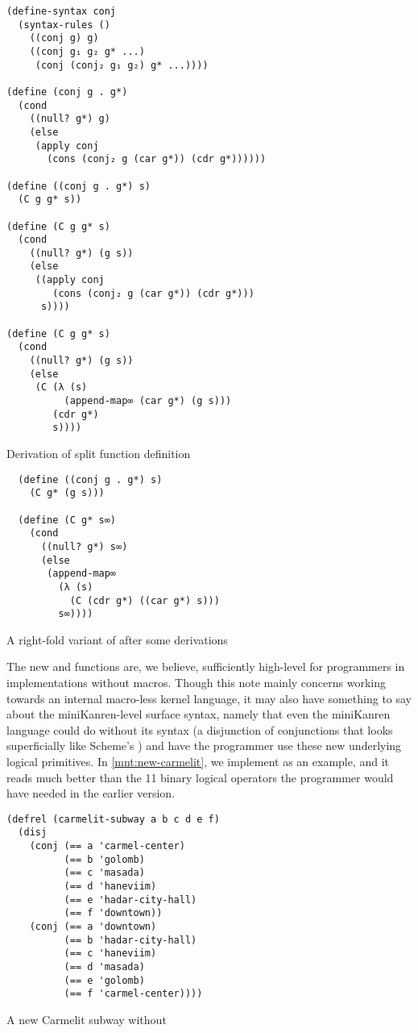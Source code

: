 \documentclass[sigplan,balance=true,pbalance=true,natbib=false]{acmart}
\begin{document}
\begin{listing}[h]
\begin{verbatim}
(define-syntax conj
  (syntax-rules ()
    ((conj g) g)
    ((conj g₁ g₂ g* ...)
     (conj (conj₂ g₁ g₂) g* ...))))

(define (conj g . g*)
  (cond
    ((null? g*) g)
    (else
     (apply conj
       (cons (conj₂ g (car g*)) (cdr g*))))))

(define ((conj g . g*) s)
  (C g g* s))

(define (C g g* s)
  (cond
    ((null? g*) (g s))
    (else
     ((apply conj
        (cons (conj₂ g (car g*)) (cdr g*)))
      s))))

(define (C g g* s)
  (cond
    ((null? g*) (g s))
    (else
     (C (λ (s)
          (append-map∞ (car g*) (g s)))
        (cdr g*)
        s))))
\end{verbatim}
  \caption{Derivation of split  function definition}\label{mnt:conj-substituted-through}
\end{listing}

\begin{listing}[h]
\begin{verbatim}
  (define ((conj g . g*) s)
    (C g* (g s)))

  (define (C g* s∞)
    (cond
      ((null? g*) s∞)
      (else
       (append-map∞
         (λ (s)
           (C (cdr g*) ((car g*) s)))
         s∞))))
\end{verbatim}
  \caption{A right-fold variant of  after some derivations}\label{mnt:conj-right-fold-definition}
\end{listing}

The new  and  functions are, we
believe, sufficiently high-level for programmers in implementations
without macros. Though this note mainly concerns working towards an
internal macro-less kernel language, it may also have something to say
about the miniKanren-level surface syntax, namely that even the
miniKanren language could do without its  syntax (a
disjunction of conjunctions that looks superficially like
Scheme's ) and have the programmer use these new
underlying logical primitives. In \cref{mnt:new-carmelit}, we
implement  as an example, and it reads
much better than the 11 binary logical operators the programmer would
have needed in the earlier version.


\begin{listing}[h]
  \begin{verbatim}
(defrel (carmelit-subway a b c d e f)
  (disj
    (conj (== a 'carmel-center)
          (== b 'golomb)
          (== c 'masada)
          (== d 'haneviim)
          (== e 'hadar-city-hall)
          (== f 'downtown))
    (conj (== a 'downtown)
          (== b 'hadar-city-hall)
          (== c 'haneviim)
          (== d 'masada)
          (== e 'golomb)
          (== f 'carmel-center))))
  \end{verbatim}
  \caption{A new Carmelit subway without }\label{mnt:new-carmelit}
\end{listing}
\end{document}
